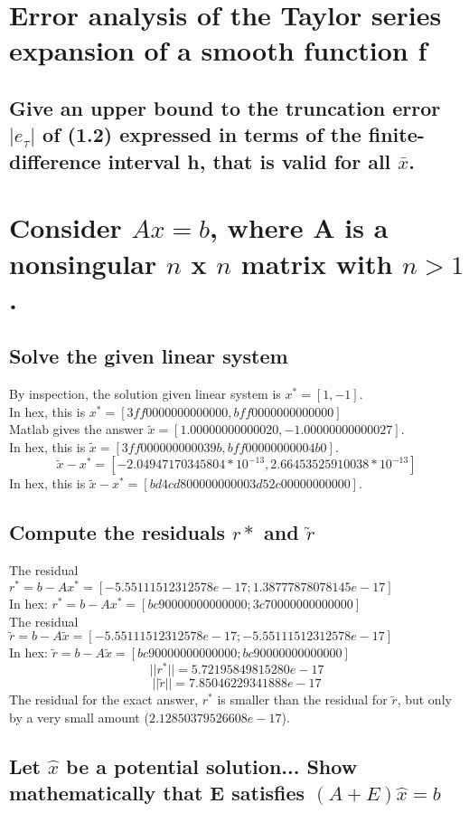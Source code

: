 \documentclass[11pt]{modart}
\begin{document}
\section{Error analysis of the Taylor series expansion of a smooth function f}
\subsection{Give an upper bound to the truncation error $|e_\tau|$ of (1.2) expressed in terms of the finite-difference interval h, that is valid for all $\bar{x}$.}

\section{Consider $Ax=b$, where A is a nonsingular $n$ x $n$ matrix with $n>1$.}
\subsection{Solve the given linear system}
By inspection, the solution given linear system is $x^*=[1, -1]$.\\
In hex, this is $x^*=[3ff0000000000000, bff0000000000000]$\\
Matlab gives the answer $\tilde{x}=[1.00000000000020, -1.00000000000027]$.\\
In hex, this is $\tilde{x} = [3ff000000000039b, bff00000000004b0]$.\\
$$\tilde{x}-x^*= [-2.04947170345804 * 10^{-13}, 2.66453525910038 * 10^{-13}]$$
In hex, this is $\tilde{x}-x^* = [bd4cd80000000000 3d52c00000000000]$.\\
\subsection{Compute the residuals $r*$ and $\tilde{r}$}
The residual $r^* = b-Ax^*=[-5.55111512312578e-17; 1.38777878078145e-17]$\\
In hex: $r^* = b-Ax^*=[bc90000000000000; 3c70000000000000]$\\
The residual $\tilde{r} = b-A\tilde{x}=[-5.55111512312578e-17; -5.55111512312578e-17]$\\
In hex: $\tilde{r} = b-A\tilde{x}=[bc90000000000000; bc90000000000000]$\\

$$||r^*||=5.72195849815280e-17$$
$$||\tilde{r}||=7.85046229341888e-17$$
The residual for the exact answer, $r^*$ is smaller than the residual for $\tilde{r}$, but only by a very small amount ($2.12850379526608e-17$).

\subsection{Let $\hat{x}$ be a potential solution... 
Show mathematically that E satisfies $(A+E)\hat{x}=b$}
\end{document}
